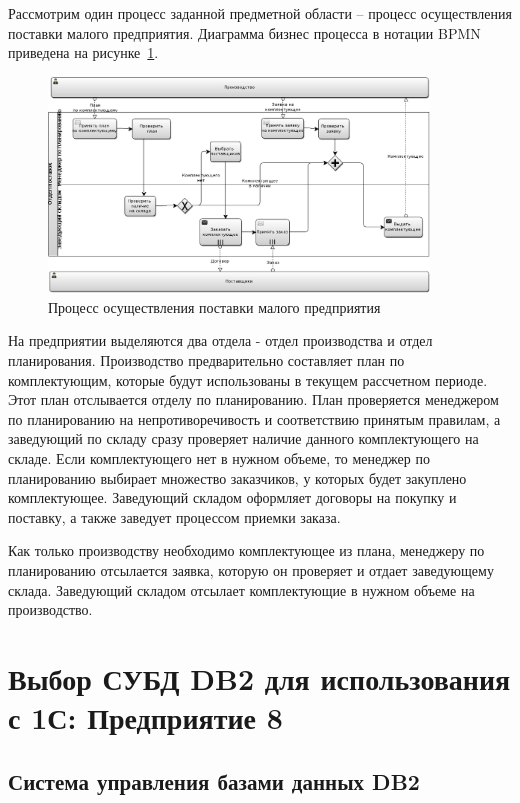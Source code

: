 \documentclass[russian,utf8,emptystyle]{eskdtext}
\begin{document}
Рассмотрим один процесс заданной предметной области – процесс осуществления поставки малого предприятия. Диаграмма бизнес процесса в нотации BPMN приведена на рисунке~\ref{fig:bpmn-1}.

\begin{figure}[h!]
\centering
\includegraphics[width=0.9\textwidth]{superpc}
\caption{Процесс осуществления поставки малого предприятия}
\label{fig:bpmn-1}
\end{figure}

На предприятии выделяются два отдела - отдел производства и отдел планирования. Производство предварительно составляет план по комплектующим, которые будут использованы в текущем рассчетном периоде. Этот план отслывается отделу по планированию. План проверяется менеджером по планированию на непротиворечивость и соответствию принятым правилам, а заведующий по складу сразу проверяет наличие данного комплектующего на складе. Если комплектующего нет в нужном объеме, то менеджер по планированию выбирает множество заказчиков, у которых будет закуплено комплектующее. Заведующий складом оформляет договоры на покупку и поставку, а также заведует процессом приемки заказа. 

Как только производству необходимо комплектующее из плана, менеджеру по планированию отсылается заявка, которую он проверяет и отдает заведующему склада. Заведующий складом отсылает комплектующие в нужном объеме на производство.

\clearpage
\section{Выбор СУБД DB2 для использования с 1С: Предприятие 8}
\subsection{Система управления базами данных DB2}
\end{document}
